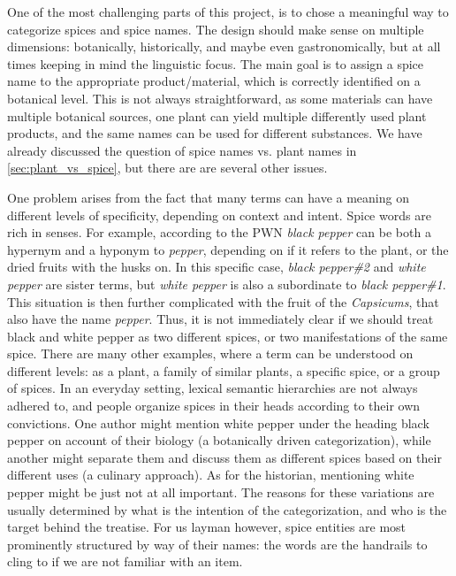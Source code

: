 One of the most challenging parts of this project, is to chose a meaningful way to categorize spices and spice names. The design should make sense on multiple dimensions: botanically, historically, and maybe even gastronomically, but at all times keeping in mind the linguistic focus. The main goal is to assign a spice name to the appropriate product/material, which is correctly identified on a botanical level. This is not always straightforward, as some materials can have multiple botanical sources, one plant can yield multiple differently used plant products, and the same names can be used for different substances. We have already discussed the question of spice names vs. plant names in \cref{sec:plant_vs_spice}, but there are are several other issues.

One problem arises from the fact that many terms can have a meaning on different levels of specificity, depending on context and intent. Spice words are rich in senses. For example, according to the \gls{PWN} \textit{black pepper} can be both a hypernym and a hyponym to \textit{pepper}, depending on if it refers to the plant, or the dried fruits with the husks on. In this specific case, \textit{black pepper\#2} and \textit{white pepper} are sister terms, but \textit{white pepper} is also a subordinate to \textit{black pepper\#1}. This situation is then further complicated with the fruit of the \textit{Capsicums}, that also have the name \textit{pepper}. Thus, it is not immediately clear if we should treat black and white pepper as two different spices, or two manifestations of the same spice. There are many other examples, where a term can be understood on different levels: as a plant, a family of similar plants, a specific spice, or a group of spices. In an everyday setting, lexical semantic hierarchies are not always adhered to, and people organize spices in their heads according to their own convictions. One author might mention white pepper under the heading black pepper on account of their biology (a botanically driven categorization), while another might separate them and discuss them as different spices based on their different uses (a culinary approach). As for the historian, mentioning white pepper might be just not at all important. The reasons for these variations are usually determined by what is the intention of the categorization, and who is the target behind the treatise. For us layman however, spice entities are most prominently structured by way of their names: the words are the handrails to cling to if we are not familiar with an item.

